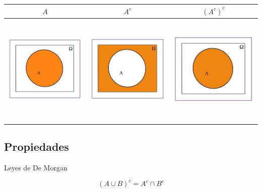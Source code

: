 \documentclass[]{book}
\begin{document}
\begin{longtable}[]{@{}ccc@{}}
\toprule
\(A\) & \(A^c\) & \((A^c)^c\)\tabularnewline
\midrule
\endhead
\includegraphics[width=\textwidth,height=2.08333in]{Images/proba1dibujos/dd2.jpg} & \includegraphics[width=\textwidth,height=2.08333in]{Images/proba1dibujos/dd1.jpg} & \includegraphics[width=\textwidth,height=2.08333in]{Images/proba1dibujos/dd3.jpg}\tabularnewline
\bottomrule
\end{longtable}

\hypertarget{propiedades-4}{%
\subsection{Propiedades}\label{propiedades-4}}

Leyes de De Morgan

\[(A\cup B)^c=A^c\cap B^c\]
\end{document}
